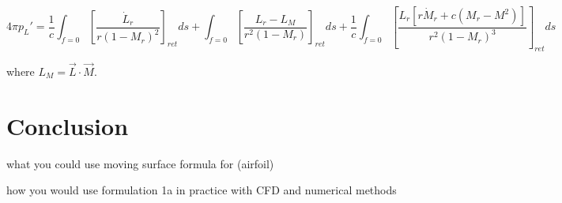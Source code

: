 \documentclass[]{aiaa-tc}%
\begin{document}
\begin{equation} \label{FarassatForm1ALoadingEx}
4\pi p_{L}' = \dfrac{1}{c}
      \int_{f=0} \left[ \dfrac{\dot{L}_r}{r (1 - M_r)^2} \right]_{ret} ds
    + \int_{f=0} \left[ \dfrac{L_r - L_M}{r^2 (1 - M_r)} \right]_{ret} ds
+ \dfrac{1}{c} \int_{f=0} \left[
    \dfrac{ L_r[r \dot{M}_r + c(M_r - M^2)] }{r^2 (1 - M_r)^3} \right]_{ret} ds
\end{equation}

\noindent where $L_M = \vec{L} \cdot \vec{M} $.




\section*{Conclusion}

what you could use moving surface formula for (airfoil)

how you would use formulation 1a in practice with CFD and numerical methods
\end{document}
